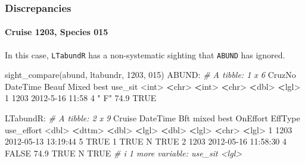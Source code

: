 \documentclass[
]{book}
\newenvironment{Shaded}{\begin{snugshade}}{\end{snugshade}}
\newcommand{\CommentTok}[1]{\textcolor[rgb]{0.56,0.35,0.01}{\textit{#1}}}
\newcommand{\ConstantTok}[1]{\textcolor[rgb]{0.00,0.00,0.00}{#1}}
\newcommand{\DecValTok}[1]{\textcolor[rgb]{0.00,0.00,0.81}{#1}}
\newcommand{\ErrorTok}[1]{\textcolor[rgb]{0.64,0.00,0.00}{\textbf{#1}}}
\newcommand{\FloatTok}[1]{\textcolor[rgb]{0.00,0.00,0.81}{#1}}
\newcommand{\FunctionTok}[1]{\textcolor[rgb]{0.00,0.00,0.00}{#1}}
\newcommand{\NormalTok}[1]{#1}
\newcommand{\SpecialCharTok}[1]{\textcolor[rgb]{0.00,0.00,0.00}{#1}}
\newcommand{\StringTok}[1]{\textcolor[rgb]{0.31,0.60,0.02}{#1}}
\begin{document}
\hypertarget{discrepancies}{%
\subsubsection*{Discrepancies}\label{discrepancies}}

\hypertarget{cruise-1203-species-015}{%
\paragraph*{Cruise 1203, Species 015}\label{cruise-1203-species-015}}

In this case, \texttt{LTabundR} has a non-systematic sighting that \texttt{ABUND} has ignored.

\begin{Shaded}
\begin{Highlighting}[]
\FunctionTok{sight\_compare}\NormalTok{(abund, ltabundr, }\DecValTok{1203}\NormalTok{, }\StringTok{\textquotesingle{}015\textquotesingle{}}\NormalTok{)}
\NormalTok{ABUND}\SpecialCharTok{:}
\CommentTok{\# A tibble: 1 x 6}
\NormalTok{  CruzNo DateTime        Beauf Mixed  best use\_sit}
   \SpecialCharTok{\textless{}}\NormalTok{int}\SpecialCharTok{\textgreater{}} \ErrorTok{\textless{}}\NormalTok{chr}\SpecialCharTok{\textgreater{}}           \ErrorTok{\textless{}}\NormalTok{int}\SpecialCharTok{\textgreater{}} \ErrorTok{\textless{}}\NormalTok{chr}\SpecialCharTok{\textgreater{}} \ErrorTok{\textless{}}\NormalTok{dbl}\SpecialCharTok{\textgreater{}} \ErrorTok{\textless{}}\NormalTok{lgl}\SpecialCharTok{\textgreater{}}  
\DecValTok{1}   \DecValTok{1203} \DecValTok{2012{-}5{-}16} \DecValTok{11}\SpecialCharTok{:}\DecValTok{58}     \DecValTok{4} \StringTok{" F"}   \FloatTok{74.9} \ConstantTok{TRUE}   

\NormalTok{LTabundR}\SpecialCharTok{:}
\CommentTok{\# A tibble: 2 x 9}
\NormalTok{  Cruise DateTime              Bft mixed  best OnEffort EffType use\_effort}
   \SpecialCharTok{\textless{}}\NormalTok{dbl}\SpecialCharTok{\textgreater{}} \ErrorTok{\textless{}}\NormalTok{dttm}\SpecialCharTok{\textgreater{}}              \ErrorTok{\textless{}}\NormalTok{dbl}\SpecialCharTok{\textgreater{}} \ErrorTok{\textless{}}\NormalTok{lgl}\SpecialCharTok{\textgreater{}} \ErrorTok{\textless{}}\NormalTok{dbl}\SpecialCharTok{\textgreater{}} \ErrorTok{\textless{}}\NormalTok{lgl}\SpecialCharTok{\textgreater{}}    \ErrorTok{\textless{}}\NormalTok{chr}\SpecialCharTok{\textgreater{}}   \ErrorTok{\textless{}}\NormalTok{lgl}\SpecialCharTok{\textgreater{}}     
\DecValTok{1}   \DecValTok{1203} \DecValTok{2012{-}05{-}13} \DecValTok{13}\SpecialCharTok{:}\DecValTok{19}\SpecialCharTok{:}\DecValTok{44}     \DecValTok{5} \ConstantTok{TRUE}    \DecValTok{1}   \ConstantTok{TRUE}\NormalTok{     N       }\ConstantTok{TRUE}      
\DecValTok{2}   \DecValTok{1203} \DecValTok{2012{-}05{-}16} \DecValTok{11}\SpecialCharTok{:}\DecValTok{58}\SpecialCharTok{:}\DecValTok{30}     \DecValTok{4} \ConstantTok{FALSE}  \FloatTok{74.9} \ConstantTok{TRUE}\NormalTok{     N       }\ConstantTok{TRUE}      
\CommentTok{\# i 1 more variable: use\_sit \textless{}lgl\textgreater{}}
\end{Highlighting}
\end{Shaded}
\end{document}
